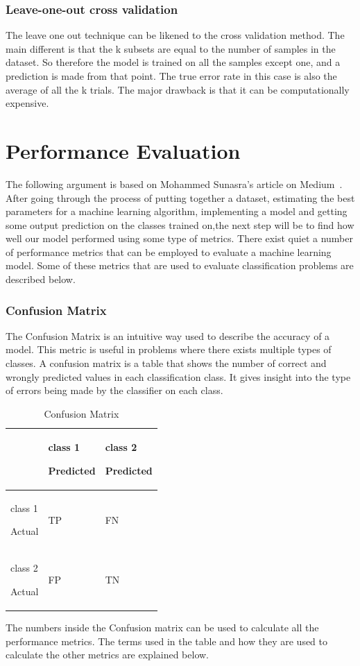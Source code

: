 \documentclass[12pt, a4paper,oneside]{report}
\begin{document}
\subsubsection{Leave-one-out cross validation}
The leave one out technique can be likened to the cross validation method. The main different is that the k subsets are equal to the number of samples in the dataset. So therefore the model is trained on all the samples except one, and a prediction is made from that point. The true error rate in this case is also the average of all the k trials. The major drawback is that it can be computationally expensive.


\section{Performance Evaluation}
The following argument is based on Mohammed Sunasra's article on Medium~\cite{performance}.
After going through the process of putting together a dataset, estimating the best parameters for a machine learning algorithm, implementing a model and getting some output prediction on the classes trained on,the next step will be to find how well our model performed using some type of metrics. There exist quiet a number of performance metrics that can be employed to evaluate a machine learning model. Some of these metrics that are used to evaluate classification problems are described below.

\subsubsection{Confusion Matrix}
The Confusion Matrix is an intuitive way used to describe the accuracy of a model. This metric is useful in problems where there exists multiple types of classes. A confusion matrix is a table that shows the number of correct and wrongly predicted values in each classification class. It gives insight into the type of errors being made by the classifier on each class.


\begin{table}[h]
	\centering {} \small
	\begin{tabular}{|p{3cm}|p{3cm}|p{3cm}|}
		\hline
		  & class 1 \par Predicted & class 2 \par Predicted \\ \hline
		class 1 \par Actual & TP & FN \\ \hline
		class 2 \par Actual & FP & TN \\ \hline
			
	\end{tabular}
	\caption {Confusion Matrix}	
	\label{table:confusion}
	\end{table}
The numbers inside the Confusion matrix can be used to calculate 
all the performance metrics. The terms used in the table and how they are used to calculate the other metrics are explained below.
\end{document}
